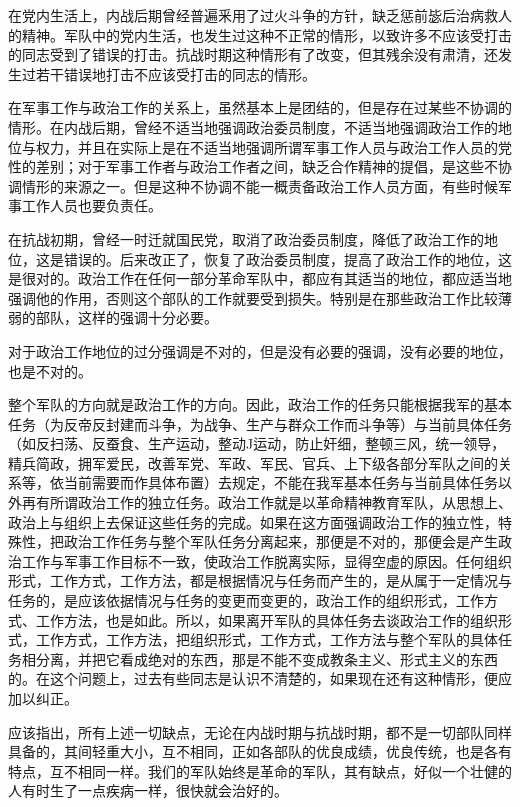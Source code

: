 在党内生活上，内战后期曾经普遍釆用了过火斗争的方针，缺乏惩前毖后治病救人的精神。军队中的党内生活，也发生过这种不正常的情形，以致许多不应该受打击的同志受到了错误的打击。抗战时期这种情形有了改变，但其残余没有肃清，还发生过若干错误地打击不应该受打击的同志的情形。

在军事工作与政治工作的关系上，虽然基本上是团结的，但是存在过某些不协调的情形。在内战后期，曾经不适当地强调政治委员制度，不适当地强调政治工作的地位与权力，并且在实际上是在不适当地强调所谓军事工作人员与政治工作人员的党性的差别；对于军事工作者与政治工作者之间，缺乏合作精神的提倡，是这些不协调情形的来源之一。但是这种不协调不能一概责备政治工作人员方面，有些时候军事工作人员也要负责任。

在抗战初期，曾经一时迁就国民党，取消了政治委员制度，降低了政治工作的地位，这是错误的。后来改正了，恢复了政治委员制度，提高了政治工作的地位，这是很对的。政治工作在任何一部分革命军队中，都应有其适当的地位，都应适当地强调他的作用，否则这个部队的工作就要受到损失。特别是在那些政治工作比较薄弱的部队，这样的强调十分必要。

对于政治工作地位的过分强调是不对的，但是没有必要的强调，没有必要的地位，也是不对的。

整个军队的方向就是政治工作的方向。因此，政治工作的任务只能根据我军的基本任务（为反帝反封建而斗争，为战争、生产与群众工作而斗争等）与当前具体任务（如反扫荡、反蚕食、生产运动，整动J运动，防止奸细，整顿三风，统一领导，精兵简政，拥军爱民，改善军党、军政、军民、官兵、上下级各部分军队之间的关系等，依当前需要而作具体布置）去规定，不能在我军基本任务与当前具体任务以外再有所谓政治工作的独立任务。政治工作就是以革命精神教育军队，从思想上、政治上与组织上去保证这些任务的完成。如果在这方面强调政治工作的独立性，特殊性，把政治工作任务与整个军队任务分离起来，那便是不对的，那便会是产生政治工作与军事工作目标不一致，使政治工作脱离实际，显得空虚的原因。任何组织形式，工作方式，工作方法，都是根据情况与任务而产生的，是从属于一定情况与任务的，是应该依据情况与任务的变更而变更的，政治工作的组织形式，工作方式、工作方法，也是如此。所以，如果离开军队的具体任务去谈政治工作的组织形式，工作方式，工作方法，把组织形式，工作方式，工作方法与整个军队的具体任务相分离，并把它看成绝对的东西，那是不能不变成教条主义、形式主义的东西的。在这个问题上，过去有些同志是认识不清楚的，如果现在还有这种情形，便应加以纠正。

应该指出，所有上述一切缺点，无论在内战时期与抗战时期，都不是一切部队同样具备的，其间轻重大小，互不相同，正如各部队的优良成绩，优良传统，也是各有特点，互不相同一样。我们的军队始终是革命的军队，其有缺点，好似一个壮健的人有时生了一点疾病一样，很快就会治好的。


